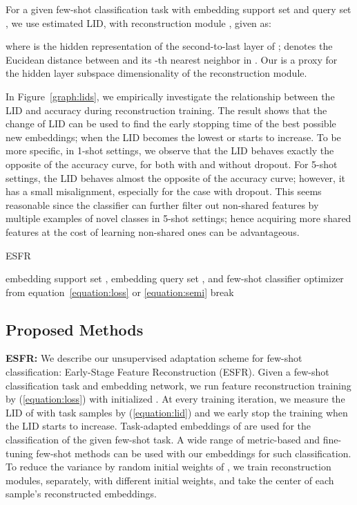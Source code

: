 \documentclass{article}
\begin{document}
For a given few-shot classification task with embedding support set  and query set , we use estimated LID, with reconstruction module , given as:

where  is the hidden representation of the second-to-last layer of ;  denotes the Eucidean distance between  and its -th nearest neighbor in .
Our  is a proxy for the hidden layer subspace dimensionality of the reconstruction module.

In Figure~\ref{graph:lids}, we empirically investigate the relationship between the LID and accuracy during reconstruction training.
The result shows that the change of LID can be used to find the early stopping time of the best possible new embeddings; when the LID becomes the lowest or starts to increase.
To be more specific, in 1-shot settings, we observe that the LID behaves exactly the opposite of the accuracy curve, for both with and without dropout.
For 5-shot settings, the LID behaves almost the opposite of the accuracy curve; however, it has a small misalignment, especially for the case with dropout.
This seems reasonable since the classifier can further filter out non-shared features by multiple examples of novel classes in 5-shot settings; hence acquiring more shared features at the cost of learning non-shared ones can be advantageous. \begin{algorithm}[tb]
	\caption{ESFR}
	\label{alg:proposed}
	\begin{algorithmic}
		 embedding support set , embedding query set , and few-shot classifier 
		\STATE  
		 optimizer
		\STATE  from equation~\ref{equation:loss} or \ref{equation:semi}
		\STATE 
		\STATE 
		\STATE break
		\ENDIF
		\STATE 
		\ENDFOR
		\ENDFOR
		\STATE  \STATE 
		\STATE {\bfseries Output:}   
	\end{algorithmic}
\end{algorithm}
\subsection{Proposed Methods}
\label{subsection:proposed}
\textbf{ESFR:}
We describe our unsupervised adaptation scheme for few-shot classification: Early-Stage Feature Reconstruction (ESFR).
Given a few-shot classification task and embedding network, we run feature reconstruction training by  (\ref{equation:loss}) with initialized .
At every training iteration, we measure the LID of  with task samples by (\ref{equation:lid}) and we early stop the training when the LID starts to increase.
Task-adapted embeddings of  are used for the classification of the given few-shot task.
A wide range of metric-based and fine-tuning few-shot methods can be used with our embeddings for such classification.
To reduce the variance by random initial weights of , we train  reconstruction modules, separately, with different initial weights, and take the center of each sample's reconstructed embeddings.
\end{document}
